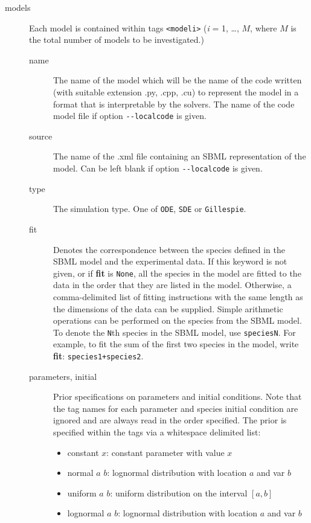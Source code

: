 \documentclass[a4paper]{report}
\begin{document}
\begin{description}
	\item[models] Each model is contained within tags \verb$<modeli>$ ({\it i} = 1, \dots, $M$, where $M$ is the total number of models to be investigated.) 
	\begin{description}
		\item[name] The name of the model which will be the name of the code written (with suitable extension .py, .cpp, .cu) to represent the model in a format that is interpretable by the solvers.  The name of the code model file if option \verb$--localcode$ is given.
		\item[source] The name of the .xml file containing an SBML representation of the model. Can be left blank if option \verb$--localcode$ is given.
		\item[type] The simulation type. One of \verb$ODE$, \verb$SDE$ or \verb$Gillespie$.
		
		\item[fit] Denotes the correspondence between the species defined in the SBML model and the experimental data. If this keyword is not given, or if \textbf{fit} is \verb$None$, all the species in the model are fitted to the data in the order that they are listed in the model. Otherwise, a comma-delimited list of fitting instructions with the same length as the dimensions of the data can be supplied. Simple arithmetic operations can be performed on the species from the SBML model. To denote the \verb$N$th species in the SBML model, use \verb$speciesN$. For example, to fit the sum of the first two species in the model, write \textbf{fit}: \verb$species1+species2$.
		
		\item[parameters, initial] Prior specifications on parameters and initial conditions. Note that the tag names for each parameter and species initial condition are ignored and are always read in the order specified. The prior is specified within the tags via a whitespace delimited list:
		\begin{itemize}
			\item constant $x$: constant parameter with value $x$
			\item normal  $a$ $b$: lognormal distribution with location $a$ and var $b$ 
			\item uniform  $a$  $b$: uniform distribution on the interval $[a, b]$
			\item lognormal  $a$ $b$: lognormal distribution with location $a$ and var $b$ 
		\end{itemize}
	\end{description}
\end{description}
\end{document}
